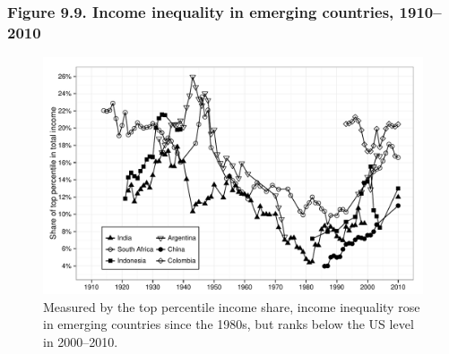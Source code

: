 \documentclass[t]{beamer}\usepackage[]{graphicx}\usepackage[]{color}
\newenvironment{knitrout}{}{} %
\begin{document}
\begin{frame}[label=Figure_9_9]
\frametitle{Figure 9.9. Income inequality in emerging countries, 1910--2010}
\begin{figure}[t]
\begin{minipage}[b]{\textwidth}
\centering
\begin{knitrout}\footnotesize
{}\color{fgcolor}

{\centering \includegraphics[width=1\linewidth]{figures/bw/Figure_9_9} 

}



\end{knitrout}
\caption{Measured by the top percentile income share, income inequality rose in emerging countries since the 1980s, but ranks below the US level in 2000--2010.}
\end{minipage}
\end{figure}
\end{frame}
\end{document}
